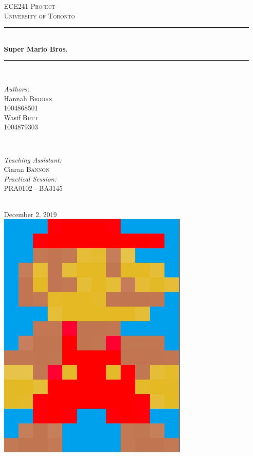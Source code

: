 \documentclass[12pt]{article}
\begin{document}
\begin{titlepage}

\newcommand{\HRule}{\rule{\linewidth}{0.5mm}} %

\center %


\textsc{\LARGE ECE241 Project}\\[1.5cm] %
\textsc{\large University of Toronto}\\[0.5cm] %

\HRule \\[0.4cm]
{ \huge \bfseries Super Mario Bros.}\\[0.4cm] %
\HRule \\[1.5cm]
 

\begin{minipage}{0.4\textwidth}
\begin{flushleft} \large
\emph{Authors:}\\
Hannah \textsc{Brooks}\\
1004868501 \\
Wasif \textsc{Butt}\\
1004879303
\end{flushleft}
\end{minipage}
~
\begin{minipage}{0.4\textwidth}
\begin{flushright} \large
\emph{Teaching Assistant:} \\
Ciaran \textsc{Bannon}\\

\emph{Practical Session:} \\ 
PRA0102 - BA3145 
\end{flushright}
\end{minipage}\\[2cm]


{\large December 2, 2019}\\[2cm] %
\includegraphics[scale=0.2]{mario.png}


\end{titlepage}
\end{document}
